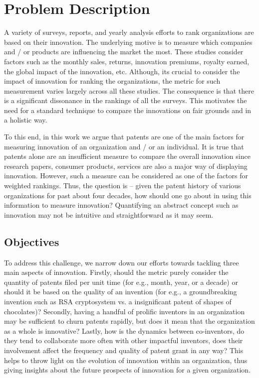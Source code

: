 \section{Problem Description}
\label{sec:prob}

A variety of surveys, reports, and yearly analysis efforts to rank
organizations are based on their innovation. The underlying motive is to measure
which companies and / or products are influencing the market the most.  These
studies consider factors such as the monthly sales, returns, innovation
premiums, royalty earned, the global impact of the innovation, etc. Although,
its crucial to consider the impact of innovation for ranking the
organizations, the metric for such measurement  varies largely across all these 
studies. The consequence is that there is a significant dissonance in the
rankings of all the surveys.  This motivates the need for a standard technique
to compare the innovations on fair grounds and in a holistic way. 

To this end, in this work we argue that patents are one of the main factors for
measuring innovation of an organization and / or an individual. It is true
that patents alone are an insufficient measure to compare the overall
innovation since research papers, consumer products, services are also a major
way of displaying innovation. However, such a measure can be considered as one
of the factors for weighted rankings. Thus, the question is -- given the patent history of
various organizations for past about four decades,  how should one go about in
using this information to measure innovation? Quantifying an abstract
concept such as innovation may not be intuitive and straightforward as it may seem.  

\subsection{Objectives}

To address this challenge, we narrow down our efforts towards tackling
three main  aspects of innovation. Firstly, should the metric purely consider
the quantity of patents filed per unit time (for e.g., month, year, or a
decade) or should it be based on the quality of an invention (for e.g., a
groundbreaking invention such as RSA cryptosystem vs. a insignificant patent
of shapes of chocolates)? Secondly, having a handful of prolific inventors in
an organization may be sufficient to churn patents rapidly, but does it mean
that the organization as a whole is innovative? Lastly, how is the dynamics
between co-inventors, do they tend to collaborate more often with other
impactful inventors, does their involvement affect the frequency and quality 
of patent grant in any way? This helps to throw light on the evolution of 
innovation within an organization, thus giving insights about the future 
prospects of innovation for a given organization.

